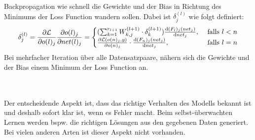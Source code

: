 \documentclass[12pt,letterpaper,ngerman]{article}
\begin{document}
\begin{definition}{Backpropagation}
    wie schnell die Gewichte und der Bias in Richtung des Minimums
    der Loss Function wandern sollen. Dabei ist $\delta_{j}^{(l)}$
    wie folgt definiert:
    \[
      \delta_j^{(l)} = 
        \frac{\partial \mathcal{L}}{\partial o(l)_j}
        \frac{\partial o(l)_j}{\partial net(l)_j}
        =
        \begin{cases}
          (\sum_{k=1}^{r_{l+1}} W^{(l+1)}_{k,j}\cdot \delta_k^{(l+1)}) 
          \dv{(F_l)_j(net_j)}{net_j},& \text{ falls } l < n  \\
          \frac{\partial \mathcal{L}(o(n)_j, y)}{\partial o(n)_j}
          \cdot 
          \dv{(F_n)_j(net_j)}{net_j}
          ,& \text{ falls } l = n
        
        \end{cases}
    \]
    Bei mehrfacher Iteration über alle Datensatzpaare,
    nähern sich die Gewichte und der Bias einem Minimum
    der Loss Function an.
\end{definition}
\hfill
\\\\
Der entscheidende Aspekt ist, dass das richtige Verhalten des Modells 
bekannt ist und deshalb sofort klar ist, wenn es Fehler macht. Beim selbst-überwachten
Lernen werden bspw. die richtigen Lösungen aus den gegebenen Daten generiert. 
Bei vielen anderen Arten ist dieser Aspekt nicht vorhanden.
\end{document}

